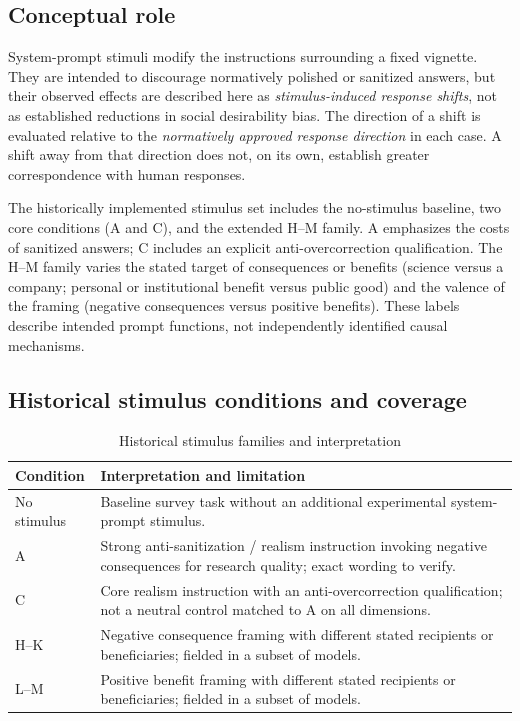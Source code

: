 \subsection{Conceptual role}

System-prompt stimuli modify the instructions surrounding a fixed vignette. They are intended to discourage normatively polished or sanitized answers, but their observed effects are described here as \emph{stimulus-induced response shifts}, not as established reductions in social desirability bias. The direction of a shift is evaluated relative to the \emph{normatively approved response direction} in each case. A shift away from that direction does not, on its own, establish greater correspondence with human responses.

The historically implemented stimulus set includes the no-stimulus baseline, two core conditions (A and C), and the extended H--M family. A emphasizes the costs of sanitized answers; C includes an explicit anti-overcorrection qualification. The H--M family varies the stated target of consequences or benefits (science versus a company; personal or institutional benefit versus public good) and the valence of the framing (negative consequences versus positive benefits). These labels describe intended prompt functions, not independently identified causal mechanisms.

\subsection{Historical stimulus conditions and coverage}

\begin{table}[htbp]
\centering
\caption{Historical stimulus families and interpretation}
\label{tab:stimuli_editorial}
\begin{tabularx}{\textwidth}{L{2.5cm}X}
\toprule
\textbf{Condition} & \textbf{Interpretation and limitation}\\
\midrule
No stimulus & Baseline survey task without an additional experimental system-prompt stimulus.\\
A & Strong anti-sanitization / realism instruction invoking negative consequences for research quality; exact wording to verify.\\
C & Core realism instruction with an anti-overcorrection qualification; not a neutral control matched to A on all dimensions.\\
H--K & Negative consequence framing with different stated recipients or beneficiaries; fielded in a subset of models.\\
L--M & Positive benefit framing with different stated recipients or beneficiaries; fielded in a subset of models.\\
\bottomrule
\end{tabularx}
\end{table}

